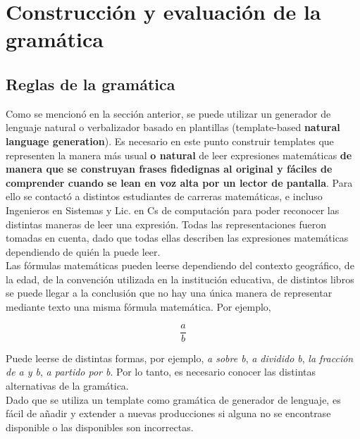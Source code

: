 
\chapter{Construcción y evaluación de la gramática}

\label{Chapter4} %


\section{Reglas de la gramática}

Como se mencionó en la sección anterior, se puede utilizar un generador de lenguaje natural o verbalizador basado en plantillas (template-based \textbf{natural language generation}). Es necesario en este punto construir templates que representen la manera más usual \textbf{o natural} de leer expresiones matemáticas \textbf{de manera que se construyan frases fidedignas al original y fáciles de comprender cuando se lean en voz alta por un lector de pantalla}. Para ello se contactó a distintos estudiantes de carreras matemáticas, e incluso Ingenieros en Sistemas y Lic. en Cs de computación para poder reconocer las distintas maneras de leer una expresión. Todas las representaciones fueron tomadas en cuenta, dado que todas ellas describen las expresiones matemáticas dependiendo de quién la puede leer.\\

Las fórmulas matemáticas pueden leerse dependiendo del contexto geográfico, de la edad, de la convención utilizada en la institución educativa, de distintos libros se puede llegar a la conclusión que no hay una única manera de representar mediante texto una misma fórmula matemática.
Por ejemplo,

$$\frac{a}{b}$$

Puede leerse de distintas formas, por ejemplo, \textit{a sobre b}, \textit{a dividido b}, \textit{la fracción de a y b}, \textit{a partido por b}. Por lo tanto, es necesario conocer las distintas alternativas de la gramática.\\

Dado que se utiliza un template como gramática de generador de lenguaje, es fácil de añadir y extender a nuevas producciones si alguna no se encontrase disponible o las disponibles son incorrectas.\\

